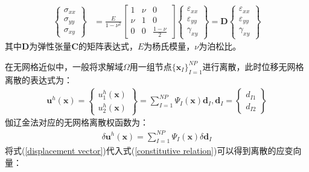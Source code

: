 \begin{equation}
\begin{split}
    \left\{\begin{matrix}
        \sigma_{xx}\\\sigma_{yy}\\\sigma_{xy}
        \end{matrix}\right\}&=\frac{E}{1-\nu^2}
        \left[\begin{matrix}
        1&\nu&0\\\nu&1&0\\0&0&\frac{1-\nu}{2}
        \end{matrix}\right]
        \left\{\begin{matrix}
        \varepsilon_{xx}\\\varepsilon_{yy}\\\gamma_{xy}
    \end{matrix}\right\}
    =\pmb{D}\left\{\begin{matrix}\varepsilon_{xx}\\\varepsilon_{yy}\\\gamma_{xy}\end{matrix}\right\}
\end{split}
\end{equation}
其中$\pmb{D}$为弹性张量$\pmb{C}$的矩阵表达式，$E$为杨氏模量，$\nu$为泊松比。\par
在无网格近似中，一般将求解域$\Omega$用一组节点$\{\pmb{x}_I\}_{I=1}^{N\!P}$进行离散，此时位移无网格离散的表达式为：
\begin{equation}\label{displacement vector}
\begin{split}
    \pmb{u}^h(\pmb{x})=\left\{\begin{matrix}u_1^h(\pmb{x})\\u_2^h(\pmb{x})
    \end{matrix}\right\}=\sum_{I=1}^{N\!P}\Psi_I(\pmb{x})\pmb d_I,\pmb{d}_I=\left\{\begin{matrix}d_{I1}\\d_{I2}\end{matrix}\right\}
\end{split}
\end{equation}
伽辽金法对应的无网格离散权函数为：
\begin{equation}
\begin{split}
    \delta\pmb{u}^h(\pmb{x})=\sum_{I=1}^{N\!P}\Psi_I(\pmb{x})\delta\pmb{d}_I
\end{split}
\end{equation}
将式(\ref{displacement vector})代入式(\ref{constitutive relation})可以得到离散的应变向量：
